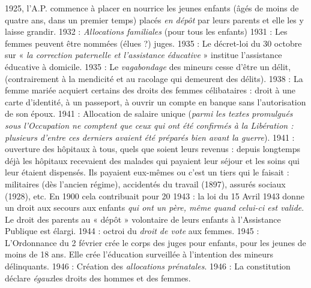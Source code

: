  1925, l'A.P. commence à placer en nourrice les jeunes enfants (âgés de moins de quatre ans, dans un premier temps) placés \emph{en dépôt} par leurs parents et elle les y laisse grandir. 
 1932 : \emph{Allocations familiales} (pour tous les enfants)
 1931 : Les femmes peuvent être nommées (élues ?) juges.
 1935 : Le décret-loi du 30 octobre sur « \emph{la correction paternelle et l'assistance éducative} » institue l'assistance éducative à domicile. 
 1935 : Le \emph{vagabondage} des mineurs cesse d'être un délit, (contrairement à la mendicité et au racolage qui demeurent des délits). 
 1938 : La femme mariée acquiert certains des droits des femmes célibataires : droit à une carte d'identité, à un passeport, à ouvrir un compte en banque sans l'autorisation de son époux.
 1941 : Allocation de salaire unique (\emph{parmi les textes promulgués sous l'Occupation ne comptent que ceux qui ont été confirmés à la Libération : plusieurs d'entre ces derniers avaient été préparés bien avant la guerre}). 
 1941 : ouverture des hôpitaux à tous, quels que soient leurs revenus : depuis longtemps déjà les hôpitaux recevaient des malades qui payaient leur séjour et les soins qui leur étaient dispensés. Ils payaient eux-mêmes ou c'est un tiers qui le faisait : militaires (dès l'ancien régime), accidentés du travail (1897), assurés sociaux (1928), etc. En 1900 cela contribuait pour 20 %
 1943 : la loi du 15 Avril 1943 donne un droit aux secours aux enfants \emph{qui ont un père, même quand celui-ci est valide}. Le droit des parents au « dépôt » volontaire de leurs enfants à l'Assistance Publique est élargi.
 1944 : octroi du \emph{droit de vote} aux femmes. 
 1945 : L'Ordonnance du 2 février crée le corps des juges pour enfants, pour les jeunes de moins de 18 ans. Elle crée l'éducation surveillée à l'intention des mineurs délinquants.
 1946 : Création des \emph{allocations prénatales}.
 1946 : La constitution déclare\emph{ égaux}les droits des hommes et des femmes.
 
